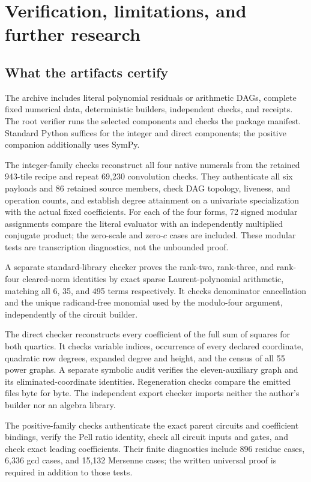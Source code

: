 \section{Verification, limitations, and further research}
\subsection{What the artifacts certify}
The archive includes literal polynomial residuals or arithmetic DAGs,
complete fixed numerical data, deterministic builders, independent checks,
and receipts. The root verifier runs the selected components and checks
the package manifest. Standard Python suffices for the integer and direct
components; the positive companion additionally uses SymPy.

The integer-family checks reconstruct all four native numerals from the
retained 943-tile recipe and repeat 69,230 convolution checks. They
authenticate all six payloads and 86 retained source members, check DAG
topology, liveness, and operation counts, and establish degree attainment
on a univariate specialization with the actual fixed coefficients.
For each of the four forms, 72 signed modular assignments compare the
literal evaluator with an independently multiplied conjugate product;
the zero-scale and zero-$c$ cases are included. These modular tests are
transcription diagnostics, not the unbounded proof.

A separate standard-library checker proves the rank-two, rank-three, and
rank-four cleared-norm identities by exact sparse Laurent-polynomial
arithmetic, matching all 6, 35, and 495 terms respectively. It checks
denominator cancellation and the unique radicand-free monomial used by
the modulo-four argument, independently of the circuit builder.

The direct checker reconstructs every coefficient of the full sum of
squares for both quartics. It checks variable indices, occurrence of every
declared coordinate, quadratic row degrees, expanded degree and height,
and the census of all 55 power graphs. A separate symbolic audit verifies
the eleven-auxiliary graph and its eliminated-coordinate identities.
Regeneration checks compare the emitted files byte for byte. The independent
export checker imports neither the author's builder nor an algebra library.

The positive-family checks authenticate the exact parent circuits and
coefficient bindings, verify the Pell ratio identity, check all circuit
inputs and gates, and check exact leading coefficients. Their finite
diagnostics include 896 residue cases, 6,336 gcd cases, and 15,132 Mersenne
cases; the written universal proof is required in addition to those tests.

